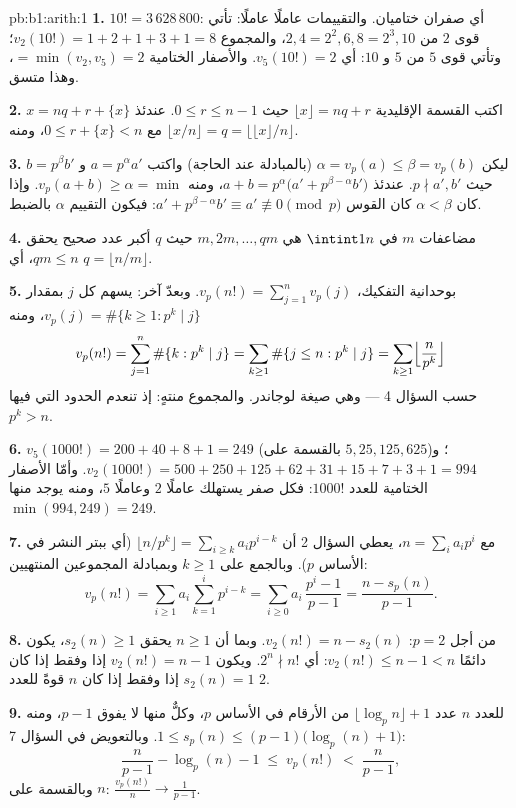\begin{solution}{pb:b1:arith:1}
\textbf{1.} $10! = 3\,628\,800$: أي صفران ختاميان. والتقييمات
عاملًا عاملًا: تأتي قوى $2$ من $2, 4 = 2^2, 6, 8 = 2^3,
10$، والمجموع $v_2(10!) = 1 + 2 + 1 + 3 + 1 = 8$؛ وتأتي قوى $5$
من $5$ و $10$: أي $v_5(10!) = 2$. والأصفار الختامية $=
\min(v_2, v_5) = 2$، وهذا متسق.

\textbf{2.} اكتب القسمة الإقليدية $\lfloor x\rfloor = nq +
r$ حيث $0 \leq r \leq n - 1$. عندئذ $x = nq + r + \{x\}$ مع $0 \leq
r + \{x\} < n$، ومنه $\lfloor x/n \rfloor = q = \bigl\lfloor \lfloor
x \rfloor / n \bigr\rfloor$.

\textbf{3.} ليكن $\alpha = v_p(a) \leq \beta = v_p(b)$ (بالمبادلة عند
الحاجة) واكتب $a = p^\alpha a'$ و $b = p^\beta b'$ حيث $p
\nmid a', b'$. عندئذ $a + b = p^\alpha\bigl(a' + p^{\beta -
\alpha}b'\bigr)$، ومنه $v_p(a + b) \geq \alpha = \min$. وإذا كان $\alpha <
\beta$ كان القوس $a' + p^{\beta-\alpha}b' \equiv a'
\not\equiv 0 \pmod p$: فيكون التقييم $\alpha$ بالضبط.

\textbf{4.} مضاعفات $m$ في $\intint1n$ هي $m, 2m, \dots,
qm$ حيث $q$ أكبر عدد صحيح يحقق $qm \leq n$، أي $q =
\lfloor n/m \rfloor$.

\textbf{5.} بوحدانية التفكيك، $v_p(n!) = \sum_{j=1}^{n}
v_p(j)$. وبعدّ آخر: يسهم كل $j$ بمقدار $v_p(j) =
\#\{k \geq 1 : p^k \mid j\}$، ومنه
\[
v_p(n!) = \sum_{j=1}^n \#\{k : p^k \mid j\}
= \sum_{k\geq1} \#\{j \leq n : p^k \mid j\}
= \sum_{k\geq1} \Bigl\lfloor \frac n{p^k} \Bigr\rfloor
\]
حسب السؤال 4 --- وهي صيغة لوجاندر. والمجموع منتهٍ: إذ تنعدم الحدود
التي فيها $p^k > n$.

\textbf{6.} $v_5(1000!) = 200 + 40 + 8 + 1 = 249$ (بالقسمة على
$5, 25, 125, 625$)؛ و$v_2(1000!) = 500 + 250 + 125 + 62 + 31 + 15 +
7 + 3 + 1 = 994$. وأمّا الأصفار الختامية للعدد $1000!$: فكل صفر يستهلك
عاملًا $2$ وعاملًا $5$، ومنه يوجد منها $\min(994, 249) = 249$.

\textbf{7.} مع $n = \sum_i a_ip^i$، يعطي السؤال 2 أن $\lfloor
n/p^k \rfloor = \sum_{i \geq k} a_ip^{i-k}$ (أي ببتر النشر
في الأساس $p$). وبالجمع على $k \geq 1$ وبمبادلة المجموعين
المنتهيين:
\[
v_p(n!) = \sum_{i\geq1} a_i \sum_{k=1}^{i} p^{i-k}
= \sum_{i\geq0} a_i\,\frac{p^i - 1}{p - 1}
= \frac{n - s_p(n)}{p - 1} .
\]

\textbf{8.} من أجل $p = 2$: $v_2(n!) = n - s_2(n)$. وبما أن $n \geq 1$
يحقق $s_2(n) \geq 1$، يكون دائمًا $v_2(n!) \leq n - 1 < n$: أي $2^n \nmid
n!$. ويكون $v_2(n!) = n - 1$ إذا وفقط إذا كان $s_2(n) = 1$ إذا وفقط إذا كان $n$ قوةً
للعدد $2$.

\textbf{9.} للعدد $n$ عدد $\lfloor \log_p n \rfloor + 1$ من الأرقام في الأساس $p$،
وكلٌّ منها لا يفوق $p - 1$، ومنه $1 \leq s_p(n) \leq
(p-1)\bigl(\log_p(n) + 1\bigr)$. وبالتعويض في السؤال 7:
\[
\frac n{p-1} - \log_p(n) - 1 \;\leq\; v_p(n!) \;<\; \frac n{p-1},
\]
وبالقسمة على $n$: $\frac{v_p(n!)}n \to \frac1{p-1}$.


\end{solution}

